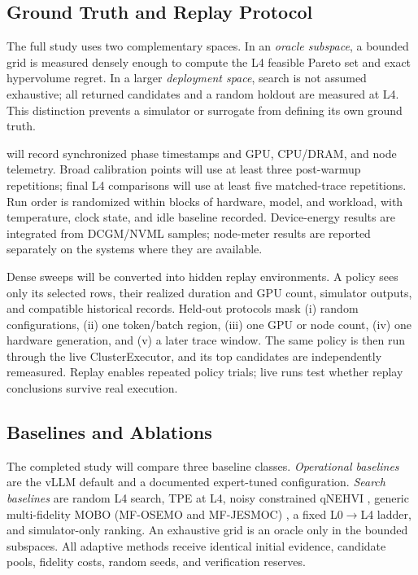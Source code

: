 \subsection{Ground Truth and Replay Protocol}

The full study uses two complementary spaces.  In an \emph{oracle subspace}, a bounded grid
is measured densely enough to compute the L4 feasible Pareto set and exact
hypervolume regret.  In a larger \emph{deployment space}, search is not assumed
exhaustive; all returned candidates and a random holdout are measured at L4.
This distinction prevents a simulator or surrogate from defining its own
ground truth.

\bench{} will record synchronized phase timestamps and GPU, CPU/DRAM, and node
telemetry.  Broad calibration points will use at least three post-warmup
repetitions; final L4 comparisons will use at least five matched-trace
repetitions.  Run order is
randomized within blocks of hardware, model, and workload, with temperature,
clock state, and idle baseline recorded.  Device-energy results are integrated
from DCGM/NVML samples; node-meter results are reported separately on the
systems where they are available.

Dense sweeps will be converted into hidden replay environments.  A policy sees
only its selected rows, their realized duration and GPU count, simulator
outputs, and compatible historical records.  Held-out protocols mask (i)
random configurations, (ii) one token/batch region, (iii) one GPU or node
count, (iv) one hardware generation, and (v) a later trace window.  The same
policy is then run through the live ClusterExecutor, and its top candidates are
independently remeasured.  Replay enables repeated policy trials; live runs
test whether replay conclusions survive real execution.

\subsection{Baselines and Ablations}

The completed study will compare three baseline classes.  \emph{Operational
baselines} are the vLLM
default and a documented expert-tuned configuration.  \emph{Search baselines}
are random L4 search, TPE at L4, noisy constrained qNEHVI
\cite{daulton2021qnehvi}, generic multi-fidelity MOBO (MF-OSEMO and
MF-JESMOC) \cite{belakaria2020mfosemo,fernandezsanchez2025mfjesmoc}, a fixed
L0$\rightarrow$L4 ladder, and simulator-only ranking.  An exhaustive grid is
an oracle only in the bounded subspaces.  All adaptive methods receive
identical initial evidence, candidate pools, fidelity costs, random seeds, and
verification reserves.

